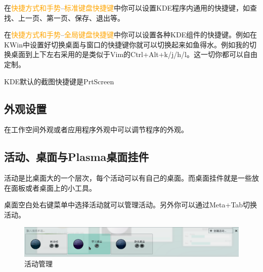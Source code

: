 \documentclass[12pt,openany]{book}
\newcommand{\menu}[1]{\textcolor{orange}{#1}}
\begin{document}
在\menu{快捷方式和手势}--\menu{标准键盘快捷键}中你可以设置KDE程序内通用的快捷键，如查找、上一页、第一页、保存、退出等。

在\menu{快捷方式和手势}--\menu{全局键盘快捷键}中你可以设置各种KDE组件的快捷键。例如在KWin中设置好切换桌面与窗口的快捷键你就可以切换起来如鱼得水。例如我的切换桌面到上下左右采用的是类似于Vim的Ctrl+Alt+k/j/h/l。这一切你都可以自由定制。

KDE默认的截图快捷键是PrtScreen
\subsection{外观设置}
在工作空间外观或者应用程序外观中可以调节程序的外观。
\subsection{活动、桌面与Plasma桌面挂件}
活动是比桌面大的一个层次，每个活动可以有自己的桌面。而桌面挂件就是一些放在面板或者桌面上的小工具。

桌面空白处右键菜单中选择活动就可以管理活动。另外你可以通过Meta+Tab切换活动。
\begin{figure}[htb]
\centering
\includegraphics[width=\textwidth]{./pic/activity.png} 
\caption{活动管理}
\end{figure}
\end{document}
